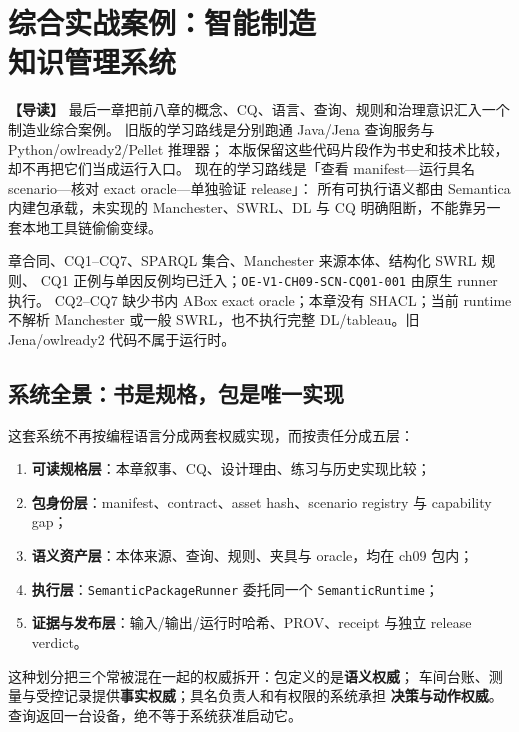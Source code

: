 \chapter[综合实战案例：智能制造知识管理系统]
  {综合实战案例：智能制造\\知识管理系统}

\begin{introbox}
\textbf{【导读】}
最后一章把前八章的概念、CQ、语言、查询、规则和治理意识汇入一个制造业综合案例。
旧版的学习路线是分别跑通 Java/Jena 查询服务与 Python/owlready2/Pellet 推理器；
本版保留这些代码片段作为书史和技术比较，却不再把它们当成运行入口。
现在的学习路线是「查看 manifest—运行具名 scenario—核对 exact oracle—单独验证 release」：
所有可执行语义都由 Semantica 内建包承载，未实现的 Manchester、SWRL、DL 与 CQ
明确阻断，不能靠另一套本地工具链偷偷变绿。
\end{introbox}

{章合同、CQ1--CQ7、SPARQL 集合、Manchester 来源本体、结构化 SWRL 规则、
CQ1 正例与单因反例均已迁入；\texttt{OE-V1-CH09-SCN-CQ01-001} 由原生 runner 执行。}
{CQ2--CQ7 缺少书内 ABox exact oracle；本章没有 SHACL；当前 runtime 不解析
Manchester 或一般 SWRL，也不执行完整 DL/tableau。旧 Jena/owlready2 代码不属于运行时。}

\section{系统全景：书是规格，包是唯一实现}

这套系统不再按编程语言分成两套权威实现，而按责任分成五层：

\begin{enumerate}
\item \textbf{可读规格层}：本章叙事、CQ、设计理由、练习与历史实现比较；
\item \textbf{包身份层}：manifest、contract、asset hash、scenario registry 与 capability gap；
\item \textbf{语义资产层}：本体来源、查询、规则、夹具与 oracle，均在 ch09 包内；
\item \textbf{执行层}：\texttt{SemanticPackageRunner} 委托同一个 \texttt{SemanticRuntime}；
\item \textbf{证据与发布层}：输入/输出/运行时哈希、PROV、receipt 与独立 release verdict。
\end{enumerate}

这种划分把三个常被混在一起的权威拆开：包定义的是\textbf{语义权威}；
车间台账、测量与受控记录提供\textbf{事实权威}；具名负责人和有权限的系统承担
\textbf{决策与动作权威}。查询返回一台设备，绝不等于系统获准启动它。

